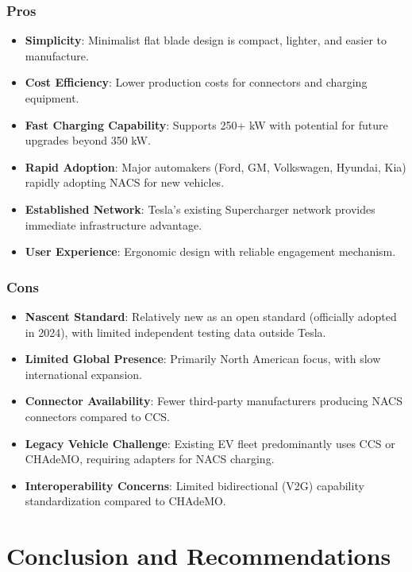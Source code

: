 \documentclass[12pt]{article}
\begin{document}
\subsubsection{Pros}
\begin{itemize}
    \item \textbf{Simplicity}: Minimalist flat blade design is compact, lighter, and easier to manufacture.
    \item \textbf{Cost Efficiency}: Lower production costs for connectors and charging equipment.
    \item \textbf{Fast Charging Capability}: Supports 250+ kW with potential for future upgrades beyond 350 kW.
    \item \textbf{Rapid Adoption}: Major automakers (Ford, GM, Volkswagen, Hyundai, Kia) rapidly adopting NACS for new vehicles.
    \item \textbf{Established Network}: Tesla's existing Supercharger network provides immediate infrastructure advantage.
    \item \textbf{User Experience}: Ergonomic design with reliable engagement mechanism.
\end{itemize}

\subsubsection{Cons}
\begin{itemize}
    \item \textbf{Nascent Standard}: Relatively new as an open standard (officially adopted in 2024), with limited independent testing data outside Tesla.
    \item \textbf{Limited Global Presence}: Primarily North American focus, with slow international expansion.
    \item \textbf{Connector Availability}: Fewer third-party manufacturers producing NACS connectors compared to CCS.
    \item \textbf{Legacy Vehicle Challenge}: Existing EV fleet predominantly uses CCS or CHAdeMO, requiring adapters for NACS charging.
    \item \textbf{Interoperability Concerns}: Limited bidirectional (V2G) capability standardization compared to CHAdeMO.
\end{itemize}

\section{Conclusion and Recommendations}
\end{document}
